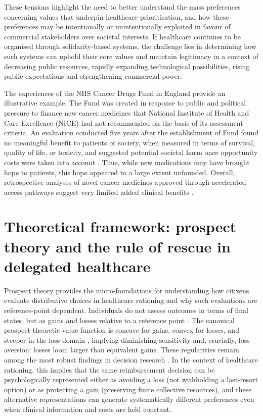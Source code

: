 \documentclass[11pt]{article}\usepackage[]{graphicx}\usepackage[]{xcolor}
\begin{document}
These tensions highlight the need to better understand the mass preferences concerning values that underpin healthcare prioritisation, and how these preferences may be intentionally or unintentionally exploited in favour of commercial stakeholders over societal interests. If healthcare continues to be organised through solidarity-based systems, the challenge lies in determining how such systems can uphold their core values and maintain legitimacy in a context of decreasing public resources, rapidly expanding technological possibilities, rising public expectations and strengthening commercial power.

The experiences of the NHS Cancer Drugs Fund in England provide an illustrative example. The Fund was created in response to public and political pressure to finance new cancer medicines that National Institute of Health and Care Excellence (NICE) had not recommended on the basis of its assessment criteria. An evaluation conducted five years after the establishment of Fund found no meaningful benefit to patients or society, when measured in terms of survival, quality of life, or toxicity, and suggested potential societal harm once opportunity costs were taken into account \parencite{Aggarwal2017CancerDrugsFund}. Thus, while new medications may have brought hope to patients, this hope appeared to a large extent unfounded. Overall, retrospective analyses of novel cancer medicines approved through accelerated access pathways suggest very limited added clinical benefits \parencite{Davis2017EvidenceCancerDrugsEMA, Hwang2020ExpeditedApprovalTherapeuticValue, Brinkhuis2024AddedBenefitRevenues}.

\section{Theoretical framework: prospect theory and the rule of rescue in delegated healthcare}\label{theory}

Prospect theory provides the micro-foundations for understanding how citizens evaluate distributive choices in healthcare rationing and why such evaluations are reference-point dependent. Individuals do not assess outcomes in terms of final states, but as gains and losses relative to a reference point \parencite[263]{Kahneman1979}. The canonical prospect-theoretic value function is concave for gains, convex for losses, and steeper in the loss domain \parencite[342]{Kahneman1984a}, implying diminishing sensitivity and, crucially, loss aversion: losses loom larger than equivalent gains. These regularities remain among the most robust findings in decision research \parencite{Barberis2013}. In the context of healthcare rationing, this implies that the same reimbursement decision can be psychologically represented either as avoiding a loss (not withholding a last-resort option) or as protecting a gain (preserving finite collective resources), and these alternative representations can generate systematically different preferences even when clinical information and costs are held constant.
\end{document}
